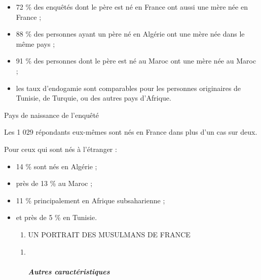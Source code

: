 \begin{itemize}
\item
  
  72 \% des enquêtés dont le père est né en France ont aussi une mère
  née en France ;
  
\item
  
  88 \% des personnes ayant un père né en Algérie ont une mère née dans
  le même pays ;
  
\item
  
  91 \% des personnes dont le père est né au Maroc ont une mère née au
  Maroc ;
  
\item
  
  les taux d'endogamie sont comparables pour les personnes originaires
  de Tunisie, de Turquie, ou des autres pays d'Afrique.
  
\end{itemize}

Pays de naissance de l'enquêté


Les 1 029 répondants eux-mêmes sont nés en France dans plus d'un cas sur
deux.

Pour ceux qui sont nés à l'étranger :


\begin{itemize}
\item
  
  14 \% sont nés en Algérie ;
  
\item
  
  près de 13 \% au Maroc ;
  
\item
  
  11 \% principalement en Afrique subsaharienne ;
  
\item
  
  et près de 5 \% en Tunisie.
  

  \begin{enumerate}
  \def\labelenumi{\Roman{enumi}.}
  \item
    UN PORTRAIT DES MUSULMANS DE FRANCE
  \end{enumerate}

  \begin{enumerate}
  \def\labelenumi{\arabic{enumi}.}
  \item ~
    \hypertarget{autres-caractuxe9ristiques}{%
    \subparagraph{Autres
    caractéristiques}\label{autres-caractuxe9ristiques}}
  \end{enumerate}
\end{itemize}

